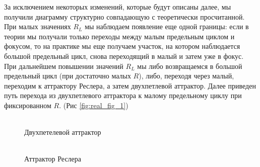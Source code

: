 \documentclass[12pt]{article}
\begin{document}
За исключением некоторых изменений, которые будут описаны далее, мы получили диаграмму структурно совпадающую с теоретически просчитанной.
При малых значениях $R_L$ мы наблюдаем появление еще одной границы: если в теории мы получали только переходы между малым предельным циклом и фокусом, то на практике мы еще получаем участок, на котором наблюдается большой предельный цикл, снова переходящий в малый и затем уже в фокус.
При дальнейшем повышении значений $R_L$ мы либо возвращаемся в большой предельный цикл (при достаточно малых $R$), либо, переходя через малый, переходим к аттрактору Реслера, а затем двухпетлевой аттрактор.
Далее приведен путь перехода из двухпетлевого аттрактора к малому предельному циклу при фиксированном $R$. (Рис \ref{fig:real_fig_1})
\begin{figure}[H]
	\begin{minipage}[h]{0.47\linewidth}
	  \\ Двухпетелевой аттрактор
	\end{minipage}
	\hfill
	\begin{minipage}[h]{0.47\linewidth}
	 \\ Аттрактор Реслера

\end{minipage}
\end{figure}
\end{document}
